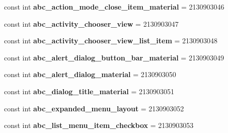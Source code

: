 \begin{DoxyCompactItemize}
\item 
\mbox{\label{class_pinned_app_1_1_droid_1_1_resource_1_1_layout_a9c339f65ea807bfe05140f477b923fb9}} 
const int {\bfseries abc\+\_\+action\+\_\+mode\+\_\+close\+\_\+item\+\_\+material} = 2130903046
\item 
\mbox{\label{class_pinned_app_1_1_droid_1_1_resource_1_1_layout_ab9293f39e9aa415d07e0a12e81cd8bb1}} 
const int {\bfseries abc\+\_\+activity\+\_\+chooser\+\_\+view} = 2130903047
\item 
\mbox{\label{class_pinned_app_1_1_droid_1_1_resource_1_1_layout_afec4fcfe12e6079751935da3ac83ef3d}} 
const int {\bfseries abc\+\_\+activity\+\_\+chooser\+\_\+view\+\_\+list\+\_\+item} = 2130903048
\item 
\mbox{\label{class_pinned_app_1_1_droid_1_1_resource_1_1_layout_a09b10510baf7cdc89e136f077ce1e5d3}} 
const int {\bfseries abc\+\_\+alert\+\_\+dialog\+\_\+button\+\_\+bar\+\_\+material} = 2130903049
\item 
\mbox{\label{class_pinned_app_1_1_droid_1_1_resource_1_1_layout_a2fbc944c3b5d067c8480a738f193dbb3}} 
const int {\bfseries abc\+\_\+alert\+\_\+dialog\+\_\+material} = 2130903050
\item 
\mbox{\label{class_pinned_app_1_1_droid_1_1_resource_1_1_layout_af8f4e84adf80b36b06ca0f533128e9ac}} 
const int {\bfseries abc\+\_\+dialog\+\_\+title\+\_\+material} = 2130903051
\item 
\mbox{\label{class_pinned_app_1_1_droid_1_1_resource_1_1_layout_a906aaa680baff49f9adb19723733c756}} 
const int {\bfseries abc\+\_\+expanded\+\_\+menu\+\_\+layout} = 2130903052
\item 
\mbox{\label{class_pinned_app_1_1_droid_1_1_resource_1_1_layout_a1dd856a48601098dc6ccab45af71f88f}} 
const int {\bfseries abc\+\_\+list\+\_\+menu\+\_\+item\+\_\+checkbox} = 2130903053

\end{DoxyCompactItemize}
